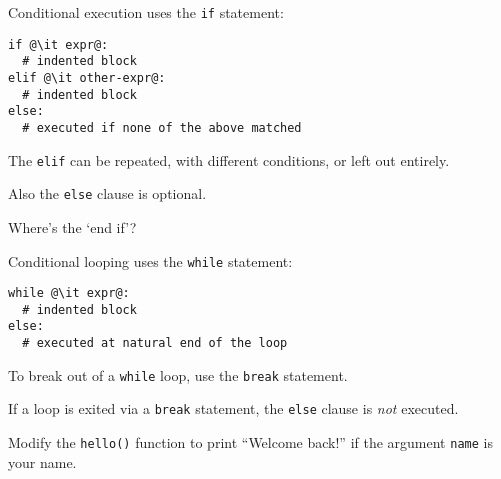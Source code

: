 \documentclass[english,serif,mathserif,xcolor=pdftex,dvipsnames,table]{beamer}
\begin{document}
\begin{frame}[fragile]
  Conditional execution uses the \texttt{if} statement:
\begin{lstlisting}
if @\it expr@:
  # indented block
elif @\it other-expr@:
  # indented block
else:
  # executed if none of the above matched
\end{lstlisting}

  \+ The \texttt{elif} can be repeated, with different conditions, or
  left out entirely.

  \+ 
  Also the \texttt{else} clause is optional.

  \+
  \begin{question}
    Where's the `end if'?

  \end{question}
\end{frame}


\begin{frame}[fragile]
  Conditional looping uses the \texttt{while} statement:
\begin{lstlisting}
while @\it expr@:
  # indented block
else:
  # executed at natural end of the loop
\end{lstlisting}

  \+
  To break out of a \texttt{while} loop, use the \texttt{break}
  statement. 

  \+
  If a loop is exited via a \texttt{break} statement, the
  \texttt{else} clause is \emph{not} executed.
\end{frame}


\begin{frame}
  \begin{exercise}
    Modify the \texttt{hello()} function to print ``Welcome back!'' if
    the argument \texttt{name} is your name.
  \end{exercise}
\end{frame}
\end{document}
